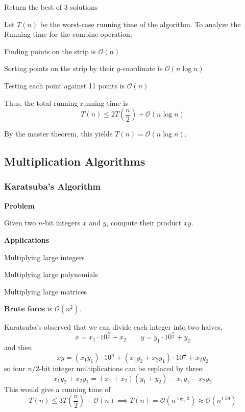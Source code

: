 \begin{listu}
    \item Return the best of 3 solutions
\end{listu}

Let $T(n)$ be the worst-case running time of the algorithm. To analyze the Running time for the combine operation, 
\begin{listu}
    \item Finding points on the strip is $\mathcal{O}(n)$
    \item Sorting points on the strip by their $y$-coordinate is $\mathcal{O}(n \log n)$
    \item Testing each point against 11 points is $\mathcal{O}(n)$
\end{listu}

Thus, the total running running time is \[
    T(n) \le 2T\left( \frac{n}{2} \right) + \mathcal{O}(n \log n)
\] 

By the master theorem, this yields $T(n) = \mathcal{O}(n \log n)$.

\subsection{Multiplication Algorithms}

\subsubsection{Karatsuba's Algorithm}

\begin{listu}
    \item \textbf{Problem}
    
    Given two $n$-bit integers $x$ and $y$, compute their product $xy$.

    \item \textbf{Applications}
    
    \begin{listu}
        \item Multiplying large integers
        \item Multiplying large polynomials
        \item Multiplying large matrices
    \end{listu}

    \item \textbf{Brute force} is $\mathcal{O}(n^2)$.
\end{listu}

Karatsuba's observed that we can divide each integer into two halves, \[
    x = x_1 \cdot 10^{\frac{n}{2}} + x_2  \qquad y = y_1 \cdot 10^{\frac{n}{2}} + y_2
\] and then \[
    xy = (x_1y_1) \cdot 10^n + (x_1y_2 + x_2y_1) \cdot 10^{\frac{n}{2}} + x_2y_2
\] so four $n/2$-bit integer multiplications can be replaced by three: \[
    x_1y_2 + x_2y_1 = (x_1 + x_2)(y_1 + y_2) - x_1y_1 - x_2y_2
\] This would give a running time of \[
    T(n) \le 3T\left( \frac{n}{2} \right) + \mathcal{O}(n) \implies T(n) = \mathcal{O}(n^{\log_2 3}) \approx \mathcal{O}(n^{1.59})
\]

